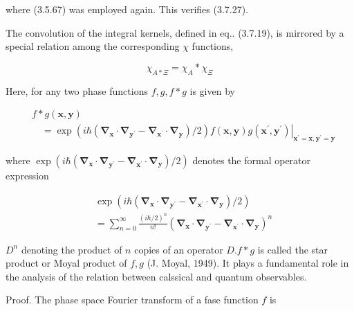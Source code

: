 \documentclass{article}
\begin{document}
where (3.5.67) was employed again. This verifies (3.7.27).

The convolution of the integral kernels, defined in eq.. (3.7.19), is mirrored
by a special relation among the corresponding $\chi$ functions,
 
\begin{equation*}
\chi_{A * \Xi}=\chi_{A} * \chi_{\Xi} \tag{3.7.31}
\end{equation*}
 

Here, for any two phase functions $f, g, f * g$ is given by
 
\begin{align*}
& f * g(\boldsymbol{x}, \boldsymbol{y})  \tag{3.7.32}\\
& \quad=\left.\exp \left(i \hbar\left(\boldsymbol{\nabla}_{\boldsymbol{x}} \cdot \boldsymbol{\nabla}_{\boldsymbol{y}^{\prime}}-\boldsymbol{\nabla}_{\boldsymbol{x}^{\prime}} \cdot \boldsymbol{\nabla}_{\boldsymbol{y}}\right) / 2\right) f(\boldsymbol{x}, \boldsymbol{y}) g\left(\boldsymbol{x}^{\prime}, \boldsymbol{y}^{\prime}\right)\right|_{\boldsymbol{x}^{\prime}=\boldsymbol{x}, \boldsymbol{y}^{\prime}=\boldsymbol{y}}
\end{align*}
 
where $\exp \left(i \hbar\left(\boldsymbol{\nabla}_{\boldsymbol{x}} \cdot \boldsymbol{\nabla}_{\boldsymbol{y}^{\prime}}-\boldsymbol{\nabla}_{\boldsymbol{x}^{\prime}} \cdot \boldsymbol{\nabla}_{\boldsymbol{y}}\right) / 2\right)$ denotes the formal operator expression
 
\begin{align*}
& \exp \left(i \hbar\left(\boldsymbol{\nabla}_{\boldsymbol{x}} \cdot \boldsymbol{\nabla}_{\boldsymbol{y}^{\prime}}-\boldsymbol{\nabla}_{\boldsymbol{x}^{\prime}} \cdot \boldsymbol{\nabla}_{\boldsymbol{y}}\right) / 2\right)  \tag{3.7.33}\\
&=\sum_{n=0}^{\infty} \frac{(i \hbar / 2)^{n}}{n!}\left(\boldsymbol{\nabla}_{\boldsymbol{x}} \cdot \boldsymbol{\nabla}_{\boldsymbol{y}^{\prime}}-\boldsymbol{\nabla}_{\boldsymbol{x}^{\prime}} \cdot \boldsymbol{\nabla}_{\boldsymbol{y}}\right)^{n}
\end{align*}
 
$D^{n}$ denoting the product of $n$ copies of an operator $D . f * g$ is called the star product or Moyal product of $f, g$ (J. Moyal, 1949). It plays a fundamental role in the analysis of the relation between calssical and quantum observables.

Proof. The phase space Fourier transform of a fase function $f$ is
 
\end{document}
